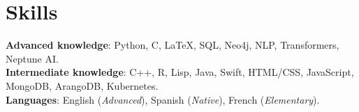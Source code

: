 \documentclass[letterpaper,11pt]{article}
\begin{document}



%
\section{Skills}
 \begin{itemize}[leftmargin=0.15in, label={}]
    \small{\item{
     \textbf{Advanced knowledge}{: Python, C, \LaTeX, SQL, Neo4j, NLP, Transformers, Neptune AI.} \\
     \textbf{Intermediate knowledge}{: C++, R, Lisp, Java, Swift, HTML/CSS, JavaScript, MongoDB, ArangoDB, Kubernetes.} \\
     \textbf{Languages}{: English (\textit{Advanced}), Spanish (\textit{Native}), French (\textit{Elementary})}.
    }}
 \end{itemize}


\end{document}

